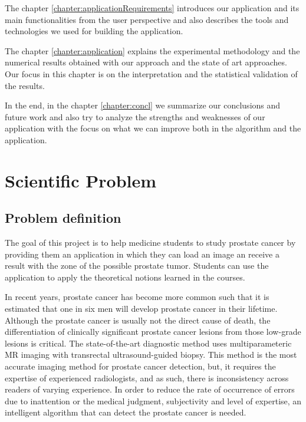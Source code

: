 \documentclass[runningheads,a4paper,11pt]{report}
\begin{document}
The chapter \ref{chapter:applicationRequirements} introduces our application and its main functionalities from the user perspective and also describes the tools and technologies we used for building the application.

The chapter \ref{chapter:application} explains the experimental methodology and the numerical results obtained with our approach and the state of art approaches. Our focus in this chapter is on the interpretation and the statistical validation of the results.

In the end, in the chapter \ref{chapter:concl} we summarize our conclusions and future work and also try to analyze the strengths and weaknesses of our application with the focus on what we can improve both in the algorithm and the application.


\chapter{Scientific Problem}
\label{section:scientificProblem}


\section{Problem definition}
\label{section:problemDefinition}

The goal of this project is to help medicine students to study prostate cancer by providing them an application in which they can load an image an receive a result with the zone of the possible prostate tumor. Students can use the application to apply the theoretical notions learned in the courses.

In recent years, prostate cancer has become more common such that it is estimated that one in six men will develop prostate cancer in their lifetime. Although the prostate cancer is usually not the direct cause of death, the differentiation of clinically
significant prostate cancer lesions from those low-grade lesions is critical. The state-of-the-art diagnostic method uses multiparameteric MR imaging with transrectal
ultrasound-guided biopsy. This method is the most accurate imaging method for prostate cancer detection, but, it requires
the expertise of experienced radiologists, and as such, there is inconsistency across readers of varying experience. In order to reduce the rate of occurrence of errors due to inattention or the medical judgment, subjectivity and level of expertise, an intelligent algorithm that can detect the prostate cancer is needed.\cite{multiparametric} 
\end{document}
